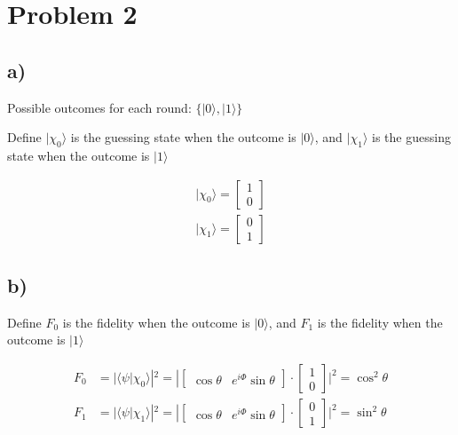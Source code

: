 \section*{Problem 2}
\subsection*{a)}
Possible outcomes for each round: $\{|0\rangle, |1\rangle\} $ \\

\begin{note}{Define} $|\chi_0\rangle$ is the guessing state when the outcome is $|0\rangle$, and $|\chi_1\rangle$ is the guessing state when the outcome is $|1\rangle$
\end{note}
\begin{align*}
    |\chi_0\rangle = \begin{bmatrix}
        1 \\ 
        0
    \end{bmatrix} \\
    |\chi_1\rangle = \begin{bmatrix}
        0 \\
        1
    \end{bmatrix}
\end{align*}

\subsection*{b)}
\begin{note}{Define}
$F_0$ is the fidelity when the outcome is $|0\rangle$, and $F_1$ is the fidelity when the outcome is $|1\rangle$
\end{note}

\begin{align*}
    F_0 &= |\langle\psi|\chi_0\rangle|^2
    = |\begin{bmatrix}
        \cos\theta & e^{i\Phi}\sin\theta
    \end{bmatrix}\cdot
    \begin{bmatrix}
        1 \\ 0
    \end{bmatrix}
    |^2 = \cos^2\theta \\
    F_1 &= |\langle\psi|\chi_1\rangle|^2
    = |\begin{bmatrix}
        \cos\theta & e^{i\Phi}\sin\theta
    \end{bmatrix}\cdot
    \begin{bmatrix}
        0 \\ 1
    \end{bmatrix}
    |^2 = \sin^2\theta
\end{align*}

